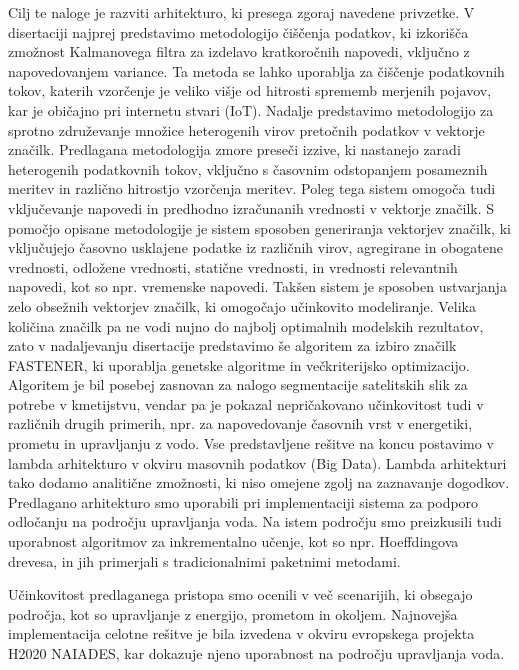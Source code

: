 Cilj te naloge je razviti arhitekturo, ki presega zgoraj navedene privzetke. 
V disertaciji najprej predstavimo metodologijo čiščenja podatkov, ki izkorišča zmožnost Kalmanovega filtra za izdelavo kratkoročnih napovedi, vključno z napovedovanjem variance. 
Ta metoda se lahko uporablja za čiščenje podatkovnih tokov, katerih vzorčenje je veliko višje od hitrosti sprememb merjenih pojavov, kar je običajno pri internetu stvari (IoT). 
Nadalje predstavimo metodologijo za sprotno združevanje množice heterogenih virov pretočnih podatkov v vektorje značilk. 
Predlagana metodologija zmore preseči izzive, ki nastanejo zaradi heterogenih podatkovnih tokov, vključno s časovnim odstopanjem posameznih meritev in različno hitrostjo vzorčenja meritev. 
Poleg tega sistem omogoča tudi vključevanje napovedi in predhodno izračunanih vrednosti v vektorje značilk. 
S pomočjo opisane metodologije je sistem sposoben generiranja vektorjev značilk, ki vključujejo časovno usklajene podatke iz različnih virov, agregirane in obogatene vrednosti, odložene vrednosti, statične vrednosti, in vrednosti relevantnih napovedi, kot so npr. vremenske napovedi. 
Takšen sistem je sposoben ustvarjanja zelo obsežnih vektorjev značilk, ki omogočajo učinkovito modeliranje.
Velika količina značilk pa ne vodi nujno do najbolj optimalnih modelskih rezultatov, zato v nadaljevanju disertacije predstavimo še algoritem za izbiro značilk FASTENER, ki uporablja genetske algoritme in večkriterijsko optimizacijo. 
Algoritem je bil posebej zasnovan za nalogo segmentacije satelitskih slik za potrebe v kmetijstvu, vendar pa je pokazal nepričakovano učinkovitost tudi v različnih drugih primerih, npr. za napovedovanje časovnih vrst v energetiki, prometu in upravljanju z vodo. 
Vse predstavljene rešitve na koncu postavimo v lambda arhitekturo v okviru masovnih podatkov (Big Data).
Lambda arhitekturi tako dodamo analitične zmožnosti, ki niso omejene zgolj na zaznavanje dogodkov.
Predlagano arhitekturo smo uporabili pri implementaciji sistema za podporo odločanju na področju upravljanja voda. 
Na istem področju smo preizkusili tudi uporabnost algoritmov za inkrementalno učenje, kot so npr. Hoeffdingova drevesa, in jih primerjali s tradicionalnimi paketnimi metodami.

Učinkovitost predlaganega pristopa smo ocenili v več scenarijih, ki obsegajo področja, kot so upravljanje z energijo, prometom in okoljem. 
Najnovejša implementacija celotne rešitve je bila izvedena v okviru evropskega projekta H2020 NAIADES, kar dokazuje njeno uporabnost na področju upravljanja voda.